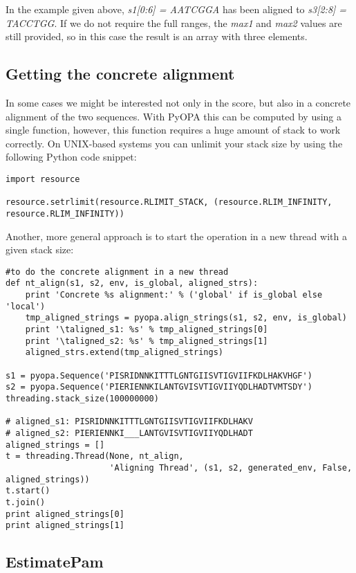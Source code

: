 \documentclass[12pt]{article}
\newcommand{\pp}{PyOPA}
\begin{document}
In the example given above, \emph{s1[0:6] = AATCGGA} has been aligned to \emph{s3[2:8] = TACCTGG}. If we do not require the full ranges, the \emph{max1} and \emph{max2} values are still provided, so in this case the result is an array with three elements.

\subsection{Getting the concrete alignment}
\label{subsec:concrete}

In some cases we might be interested not only in the score, but also in a concrete alignment of the two sequences. With \pp{} this can be computed by using a single function, however, this function requires a huge amount of stack to work correctly. On UNIX-based systems you can unlimit your stack size by using the following Python code snippet:
\begin{lstlisting}
import resource

resource.setrlimit(resource.RLIMIT_STACK, (resource.RLIM_INFINITY, resource.RLIM_INFINITY))
\end{lstlisting}

Another, more general approach is to start the operation in a new thread with a given stack size:

\begin{lstlisting}
#to do the concrete alignment in a new thread
def nt_align(s1, s2, env, is_global, aligned_strs):
    print 'Concrete %s alignment:' % ('global' if is_global else 'local')
    tmp_aligned_strings = pyopa.align_strings(s1, s2, env, is_global)
    print '\taligned_s1: %s' % tmp_aligned_strings[0]
    print '\taligned_s2: %s' % tmp_aligned_strings[1]
    aligned_strs.extend(tmp_aligned_strings)

s1 = pyopa.Sequence('PISRIDNNKITTTLGNTGIISVTIGVIIFKDLHAKVHGF')
s2 = pyopa.Sequence('PIERIENNKILANTGVISVTIGVIIYQDLHADTVMTSDY')
threading.stack_size(100000000)

# aligned_s1: PISRIDNNKITTTLGNTGIISVTIGVIIFKDLHAKV
# aligned_s2: PIERIENNKI___LANTGVISVTIGVIIYQDLHADT
aligned_strings = []
t = threading.Thread(None, nt_align,
                     'Aligning Thread', (s1, s2, generated_env, False, aligned_strings))
t.start()
t.join()
print aligned_strings[0]
print aligned_strings[1]
\end{lstlisting}

\subsection{EstimatePam}
\label{subsec:EPam}
\end{document}
